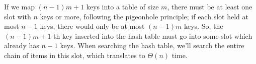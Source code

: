 \documentclass[11pt]{article}
\begin{document}
If we map $(n-1)m + 1$ keys into a table of size $m$, there must be at least one slot with $n$ keys or more, following the pigeonhole principle; if each slot held at most $n -1$ keys, there would only be at most $(n-1)m$ keys. So, the $(n-1)m + 1$-th key inserted into the hash table must go into some slot which already has $n-1$ keys. When searching the hash table, we'll search the entire chain of items in this slot, which translates to $\Theta(n)$ time. 
\end{document}
